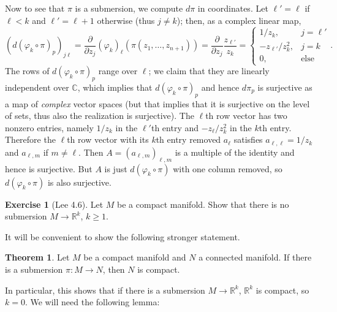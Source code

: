 \documentclass[10pt]{article}
\newcommand{\RR}{\mathbb{R}}
\newcommand{\CC}{\mathbb{C}}
\theoremstyle{definition}
\newtheorem{exer}{Exercise}
\newtheorem{theorem}[lemma]{Theorem}
\begin{document}
Now to see that $\pi$ is a submersion, we compute $d\pi$ in coordinates. Let $\ell' = \ell$ if $\ell < k$ and $\ell' = \ell + 1$ otherwise (thus $j \neq k$); then, as a complex linear map,
$$(d(\varphi_k \circ \pi)_p)_{j\ell} = \frac{\partial}{\partial z_j} (\varphi_k)_\ell(\pi(z_1, \dots, z_{n+1})) = \frac{\partial}{\partial z_j} \frac{z_{\ell'}}{z_k} = \begin{cases}
1/z_k, & j = \ell'\\
-z_{\ell'}/z_k^2, & j = k\\
0, & \text{else}
\end{cases}.$$
The rows of $d(\varphi_k \circ \pi)_p$ range over $\ell$; we claim that they are linearly independent over $\CC$, which implies that $d(\varphi_k \circ \pi)_p$ and hence $d\pi_p$ is surjective as a map of \emph{complex} vector spaces (but that implies that it is surjective on the level of sets, thus also the realization is surjective).
The $\ell$th row vector has two nonzero entries, namely $1/z_k$ in the $\ell'$th entry and $-z_\ell/z_k^2$ in the $k$th entry.
Therefore the $\ell$th row vector with its $k$th entry removed $a_\ell$ satisfies $a_{\ell,\ell} = 1/z_k$ and $a_{\ell,m}$ if $m \neq \ell$.
Then $A = (a_{\ell,m})_{\ell,m}$ is a multiple of the identity and hence is surjective. But $A$ is just $d(\varphi_k \circ \pi)$ with one column removed, so $d(\varphi_k \circ \pi)$ is also surjective.


\begin{exer}[Lee 4.6]
Let $M$ be a compact manifold. Show that there is no submersion $M \to \RR^k$, $k \geq 1$.
\end{exer}

It will be convenient to show the following stronger statement.

\begin{theorem}
Let $M$ be a compact manifold and $N$ a connected manifold.
If there is a submersion $\pi: M \to N$, then $N$ is compact.
\end{theorem}

In particular, this shows that if there is a submersion $M \to \RR^k$, $\RR^k$ is compact, so $k = 0$.
We will need the following lemma:
\end{document}
